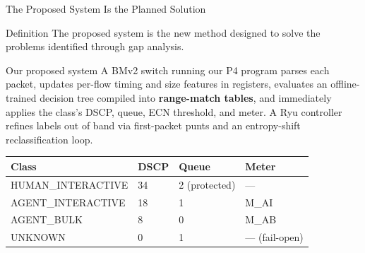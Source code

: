 \documentclass[aspectratio=169,11pt]{beamer}
\begin{document}
\begin{frame}{The Proposed System Is the Planned Solution}
  \begin{block}{Definition}
    The proposed system is the new method designed to solve the problems identified through gap
    analysis.
  \end{block}
  \begin{exampleblock}{Our proposed system}
    A BMv2 switch running our P4 program parses each packet, updates per-flow timing and size
    features in registers, evaluates an offline-trained decision tree compiled into
    \textbf{range-match tables}, and immediately applies the class's DSCP, queue, ECN threshold,
    and meter. A Ryu controller refines labels out of band via first-packet punts and an
    entropy-shift reclassification loop.
  \end{exampleblock}
  \vspace{-0.3em}
  {\footnotesize
  \begin{center}
  \begin{tabular}{@{}llll@{}}
    \toprule
    \textbf{Class} & \textbf{DSCP} & \textbf{Queue} & \textbf{Meter}\\
    \midrule
    HUMAN\_INTERACTIVE & 34 & 2 (protected) & ---\\
    AGENT\_INTERACTIVE & 18 & 1 & M\_AI\\
    AGENT\_BULK        & 8  & 0 & M\_AB\\
    UNKNOWN            & 0  & 1 & --- (fail-open)\\
    \bottomrule
  \end{tabular}
  \end{center}}
\end{frame}
\end{document}
